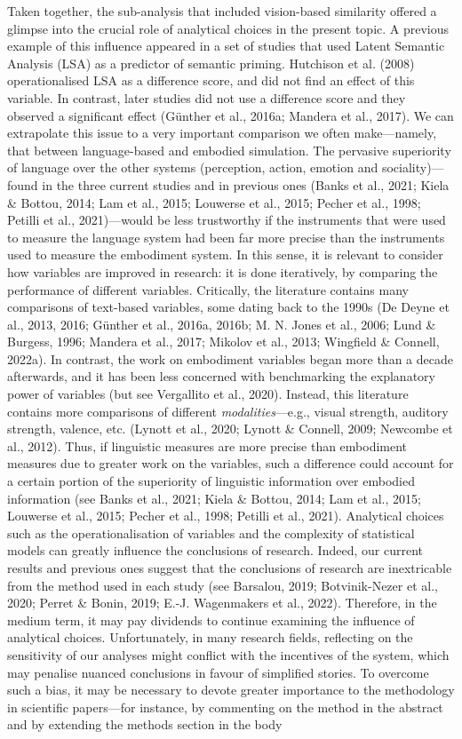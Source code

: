 \documentclass[
  12pt,
  man,floatsintext]{apa7}
\begin{document}
Taken together, the sub-analysis that included vision-based similarity offered a glimpse into the crucial role of analytical choices in the present topic. A previous example of this influence appeared in a set of studies that used Latent Semantic Analysis (LSA) as a predictor of semantic priming. Hutchison et al. (2008) operationalised LSA as a difference score, and did not find an effect of this variable. In contrast, later studies did not use a difference score and they observed a significant effect (Günther et al., 2016a; Mandera et al., 2017). We can extrapolate this issue to a very important comparison we often make---namely, that between language-based and embodied simulation. The pervasive superiority of language over the other systems (perception, action, emotion and sociality)---found in the three current studies and in previous ones (Banks et al., 2021; Kiela \& Bottou, 2014; Lam et al., 2015; Louwerse et al., 2015; Pecher et al., 1998; Petilli et al., 2021)---would be less trustworthy if the instruments that were used to measure the language system had been far more precise than the instruments used to measure the embodiment system. In this sense, it is relevant to consider how variables are improved in research: it is done iteratively, by comparing the performance of different variables. Critically, the literature contains many comparisons of text-based variables, some dating back to the 1990s (De Deyne et al., 2013, 2016; Günther et al., 2016a, 2016b; M. N. Jones et al., 2006; Lund \& Burgess, 1996; Mandera et al., 2017; Mikolov et al., 2013; Wingfield \& Connell, 2022a). In contrast, the work on embodiment variables began more than a decade afterwards, and it has been less concerned with benchmarking the explanatory power of variables (but see Vergallito et al., 2020). Instead, this literature contains more comparisons of different \emph{modalities}---e.g., visual strength, auditory strength, valence, etc. (Lynott et al., 2020; Lynott \& Connell, 2009; Newcombe et al., 2012). Thus, if linguistic measures are more precise than embodiment measures due to greater work on the variables, such a difference could account for a certain portion of the superiority of linguistic information over embodied information (see Banks et al., 2021; Kiela \& Bottou, 2014; Lam et al., 2015; Louwerse et al., 2015; Pecher et al., 1998; Petilli et al., 2021). Analytical choices such as the operationalisation of variables and the complexity of statistical models can greatly influence the conclusions of research. Indeed, our current results and previous ones suggest that the conclusions of research are inextricable from the method used in each study (see Barsalou, 2019; Botvinik-Nezer et al., 2020; Perret \& Bonin, 2019; E.-J. Wagenmakers et al., 2022). Therefore, in the medium term, it may pay dividends to continue examining the influence of analytical choices. Unfortunately, in many research fields, reflecting on the sensitivity of our analyses might conflict with the incentives of the system, which may penalise nuanced conclusions in favour of simplified stories. To overcome such a bias, it may be necessary to devote greater importance to the methodology in scientific papers---for instance, by commenting on the method in the abstract and by extending the methods section in the body 
\end{document}
